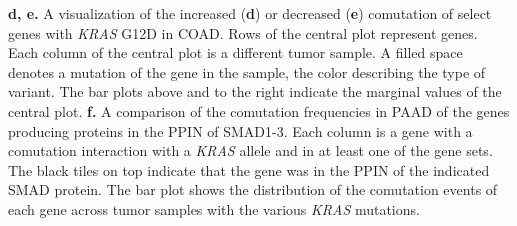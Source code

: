 \documentclass[english, 10pt, letterpaper]{article}
\newcommand{\KRAS}{\emph{KRAS}}
\begin{document}
\textbf{d, e.} A visualization of the increased (\textbf{d}) or decreased (\textbf{e}) comutation of select genes with \KRAS{} G12D in COAD. Rows of the central plot represent genes. Each column of the central plot is a different tumor sample. A filled space denotes a mutation of the gene in the sample, the color describing the type of variant. The bar plots above and to the right indicate the marginal values of the central plot.
\textbf{f.} A comparison of the comutation frequencies in PAAD of the genes producing proteins in the PPIN of SMAD1-3. Each column is a gene with a comutation interaction with a \KRAS{} allele and in at least one of the gene sets. The black tiles on top indicate that the gene was in the PPIN of the indicated SMAD protein. The bar plot shows the distribution of the comutation events of each gene across tumor samples with the various \KRAS{} mutations.
\newpage
\end{document}
